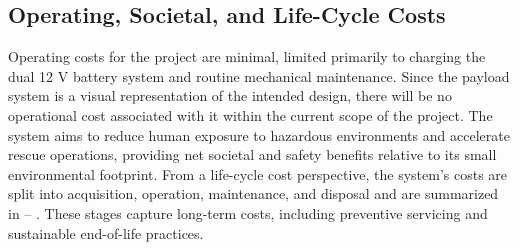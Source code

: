 \subsection{Operating, Societal, and Life-Cycle Costs}
\label{sec:operating_costs}
Operating costs for the project are minimal, limited primarily to charging the dual 12 V battery system and routine mechanical maintenance. Since the payload system is a visual representation of the intended design, there will be no operational cost associated with it within the current scope of the project. The system aims to reduce human exposure to hazardous environments and accelerate rescue operations, providing net societal and safety benefits relative to its small environmental footprint. From a life-cycle cost perspective, the system’s costs are split into acquisition, operation, maintenance, and disposal and are summarized in --%
. 
These stages capture long-term costs, including preventive servicing and sustainable end-of-life practices.